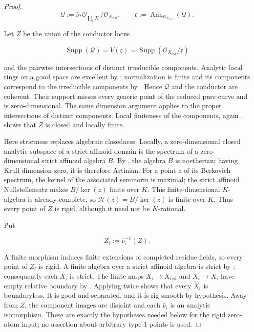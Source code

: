 \begin{proof}
\[
 \mathcal Q:=\bar\nu_*\mathcal O_{\coprod_i\widetilde X_i}
                 /\mathcal O_{X_{\mathrm{red}}},
 \qquad
 \mathfrak c:=\operatorname{Ann}_{\mathcal O_{X_{\mathrm{red}}}}
                         (\mathcal Q).
\]

Let \(Z\) be the union of the conductor locus

\[
 \operatorname{Supp}(\mathcal Q)
   =V(\mathfrak c)
   =\operatorname{Supp}(\mathcal O_{X_{\mathrm{red}}}/\mathfrak c)
\]

and the pairwise intersections of distinct irreducible components.
Analytic local rings on a good space are excellent by
\cite[\S11.1.10]{CLD25}; normalization is finite and its components
correspond to the irreducible components by
\cite[\S11.3.1]{CLD25}.  Hence \(\mathcal Q\) and the conductor are
coherent.  Their support misses every generic point of the reduced pure
curve and is zero-dimensional.  The same dimension argument applies to
the proper intersections of distinct components.  Local finiteness of the
components, again \cite[\S11.2.5]{CLD25}, shows that \(Z\) is closed and
locally finite.

Here strictness replaces algebraic closedness.  Locally, a
zero-dimensional closed analytic subspace of a strict affinoid domain is
the spectrum of a zero-dimensional strict affinoid algebra \(B\).  By
\cite[Theorem~4.5]{Tate71Rigid}, the algebra \(B\) is noetherian; having
Krull dimension zero, it is therefore Artinian.
For a point \(z\) of its Berkovich spectrum, the kernel of the associated
seminorm is maximal; the strict affinoid Nullstellensatz
\cite[Theorem~4.5]{Tate71Rigid} makes
\(B/\ker(z)\) finite over \(K\).  This finite-dimensional \(K\)-algebra is
already complete, so
\(\mathcal H(z)=B/\ker(z)\) is finite over \(K\).  Thus every point of
\(Z\) is rigid, although it need not be \(K\)-rational.

Put

\begin{equation}
\label{eq:p21p3-gfnr-conductor-preimage}
                         Z_i:=\bar\nu_i^{-1}(Z).
\end{equation}

A finite morphism induces finite extensions of completed residue fields,
so every point of \(Z_i\) is rigid.  A finite algebra over a strict
affinoid algebra is strict by \cite[Theorem~4.4]{Tate71Rigid};
consequently each \(\widetilde X_i\) is strict.  The finite maps
\(X_i\to X_{\mathrm{red}}\) and
\(\widetilde X_i\to X_i\) have empty relative boundary by
\cite[\S11.4.4]{CLD25}.  Applying
\cite[(11.4.1.3)]{CLD25} twice shows that every
\(\widetilde X_i\) is boundaryless.  It is good and separated, and it is
rig-smooth by hypothesis.  Away from \(Z\), the component images are
disjoint and each \(\bar\nu_i\) is an analytic isomorphism.  These are
exactly the hypotheses needed below for the rigid zero-atom input; no
assertion about arbitrary type-\(1\) points is used.


\end{proof}
